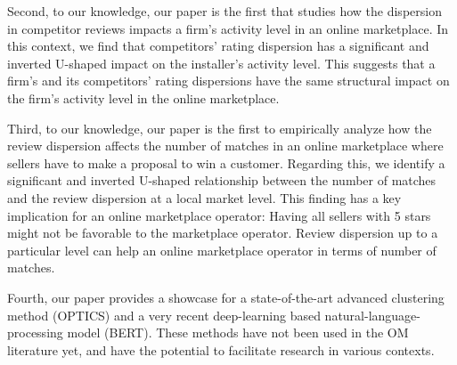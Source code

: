 \documentclass[msom,blindrev]{informs3}
\begin{document}
	
Second, to our knowledge, our paper is the first that studies how the dispersion in competitor reviews impacts a firm's activity level in an online marketplace. In this context, we find that competitors' rating dispersion has a significant and inverted U-shaped impact on the installer's activity level. This suggests that a firm's and its competitors' rating dispersions have the same structural impact on the firm's activity level in the online marketplace.

Third, to our knowledge, our paper is the first to empirically analyze how the review dispersion affects the number of matches in an online marketplace where sellers have to make a proposal to win a customer. Regarding this, we identify a significant and inverted U-shaped relationship between the number of matches and the review dispersion at a local market level. This finding has a key implication for an online marketplace operator: Having all sellers with 5 stars might not be favorable to the marketplace operator. Review dispersion up to a particular level can help an online marketplace operator in terms of number of matches.

Fourth, our paper provides a showcase for a state-of-the-art advanced clustering method (OPTICS) and a very recent deep-learning based natural-language-processing model (BERT). These methods have not been used in the OM literature yet, and have the potential to facilitate research in various contexts.

	
	
	
\end{document}
